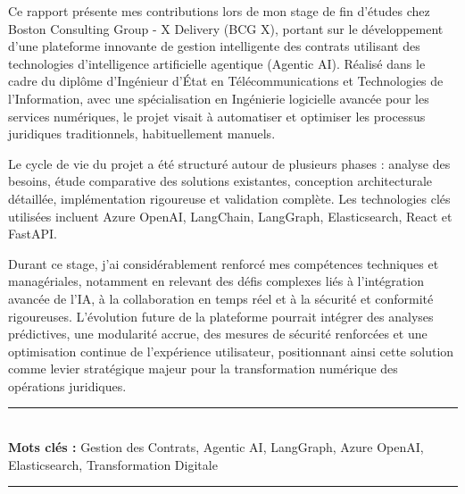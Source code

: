Ce rapport présente mes contributions lors de mon stage de fin d’études chez Boston Consulting Group - X Delivery (BCG X), portant sur le développement d’une plateforme innovante de gestion intelligente des contrats utilisant des technologies d’intelligence artificielle agentique (Agentic AI). Réalisé dans le cadre du diplôme d’Ingénieur d’État en Télécommunications et Technologies de l’Information, avec une spécialisation en Ingénierie logicielle avancée pour les services numériques, le projet visait à automatiser et optimiser les processus juridiques traditionnels, habituellement manuels.\mynewline

Le cycle de vie du projet a été structuré autour de plusieurs phases : analyse des besoins, étude comparative des solutions existantes, conception architecturale détaillée, implémentation rigoureuse et validation complète. Les technologies clés utilisées incluent Azure OpenAI, LangChain, LangGraph, Elasticsearch, React et FastAPI.\mynewline

Durant ce stage, j’ai considérablement renforcé mes compétences techniques et managériales, notamment en relevant des défis complexes liés à l’intégration avancée de l’IA, à la collaboration en temps réel et à la sécurité et conformité rigoureuses. L’évolution future de la plateforme pourrait intégrer des analyses prédictives, une modularité accrue, des mesures de sécurité renforcées et une optimisation continue de l’expérience utilisateur, positionnant ainsi cette solution comme levier stratégique majeur pour la transformation numérique des opérations juridiques.

\bigskip

\noindent\rule{\linewidth}{0.3mm} \\[0.4cm] 
\textbf{Mots clés :}
Gestion des Contrats, Agentic AI, LangGraph, Azure OpenAI, Elasticsearch, Transformation Digitale
\\[0.1cm]
\noindent\rule{\linewidth}{0.3mm} \\[0.6cm] 
